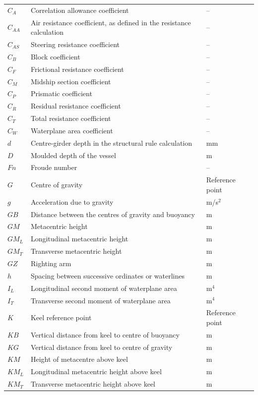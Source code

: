 \begin{appendices}
\begin{longtable}{@{}p{}
                      p{}
                      p{}@{}}
$C_A$ & Correlation allowance coefficient & -- \\
$C_{AA}$ & Air resistance coefficient, as defined in the resistance calculation & -- \\
$C_{AS}$ & Steering resistance coefficient & -- \\
$C_B$ & Block coefficient & -- \\
$C_F$ & Frictional resistance coefficient & -- \\
$C_M$ & Midship section coefficient & -- \\
$C_P$ & Prismatic coefficient & -- \\
$C_R$ & Residual resistance coefficient & -- \\
$C_T$ & Total resistance coefficient & -- \\
$C_W$ & Waterplane area coefficient & -- \\

$d$ & Centre-girder depth in the structural rule calculation & mm \\
$D$ & Moulded depth of the vessel & m \\

$Fn$ & Froude number & -- \\
$G$ & Centre of gravity & Reference point \\
$g$ & Acceleration due to gravity & m/s$^2$ \\
$GB$ & Distance between the centres of gravity and buoyancy & m \\
$GM$ & Metacentric height & m \\
$GM_L$ & Longitudinal metacentric height & m \\
$GM_T$ & Transverse metacentric height & m \\
$GZ$ & Righting arm & m \\

$h$ & Spacing between successive ordinates or waterlines & m \\
$I_L$ & Longitudinal second moment of waterplane area & m$^4$ \\
$I_T$ & Transverse second moment of waterplane area & m$^4$ \\

$K$ & Keel reference point & Reference point \\
$KB$ & Vertical distance from keel to centre of buoyancy & m \\
$KG$ & Vertical distance from keel to centre of gravity & m \\
$KM$ & Height of metacentre above keel & m \\
$KM_L$ & Longitudinal metacentric height above keel & m \\
$KM_T$ & Transverse metacentric height above keel & m \\


\end{longtable}
\end{appendices}
